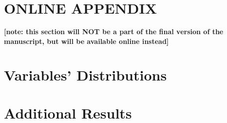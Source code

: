 \documentclass[11pt, letterpaper]{article}
\begin{document}
\begin{spacing}{1.9}






 \section*{\Huge ONLINE APPENDIX}
 \textbf{[note: this section will NOT be a part of the final version of
   the manuscript, but will be available online instead]} %





\section{Variables' Distributions}



\section{Additional Results}



\end{spacing}
\end{document}
